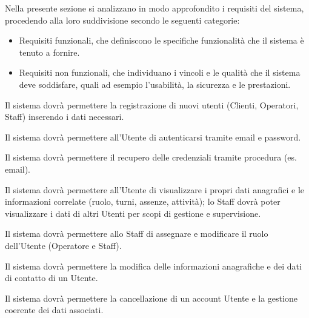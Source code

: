 \documentclass[a4paper]{report}
\begin{document}

Nella presente sezione si analizzano in modo approfondito i requisiti del sistema, procedendo alla loro suddivisione secondo le seguenti categorie:
\begin{itemize}
    \item Requisiti funzionali, che definiscono le specifiche funzionalità che il sistema è tenuto a fornire.
    \item Requisiti non funzionali, che individuano i vincoli e le qualità che il sistema deve soddisfare, quali ad esempio l'usabilità, la sicurezza e le prestazioni.
\end{itemize}




Il sistema dovrà permettere la registrazione di nuovi utenti (Clienti, Operatori, Staff) inserendo i dati necessari.


Il sistema dovrà permettere all’Utente di autenticarsi tramite email e password.


Il sistema dovrà permettere il recupero delle credenziali tramite procedura (es. email).


Il sistema dovrà permettere all'Utente di visualizzare i propri dati anagrafici e le informazioni correlate (ruolo, turni, assenze, attività); lo Staff dovrà poter visualizzare i dati di altri Utenti per scopi di gestione e supervisione.


Il sistema dovrà permettere allo Staff di assegnare e modificare il ruolo dell'Utente (Operatore e Staff).


Il sistema dovrà permettere la modifica delle informazioni anagrafiche e dei dati di contatto di un Utente.


Il sistema dovrà permettere la cancellazione di un account Utente e la gestione coerente dei dati associati.
\end{document}
